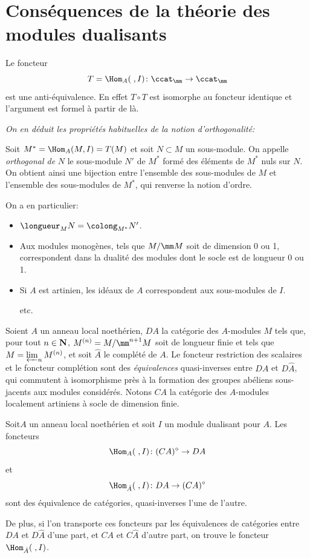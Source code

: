 \section{Cons\'equences de la th\'eorie des modules dualisants} \label{IV.5}

Le foncteur\pageoriginale
$$
T=\Hom_{A}(\;, I)\colon \ccat_{\mm}\to \ccat_{\mm}
$$
est une anti-\'equivalence. En effet $T\circ T$ est isomorphe au foncteur identique et l'argument est formel \`a partir de l\`a.

\emph{On en d\'eduit les propri\'et\'es habituelles de la notion d'orthogonalit\'e:}

Soit $M^{*}=\Hom_{A}(M, I)=T(M)$ et soit $N\subset M$ un sous-module. On appelle \emph{orthogonal de} $N$ le sous-module $N'$ de $M^{*}$ form\'e des \'el\'ements de $M^*$ nuls sur $N$. On obtient ainsi une bijection entre l'ensemble des sous-modules de $M$ et l'ensemble des sous-modules de $M^{*}$, qui renverse la notion d'ordre.

On a en particulier:
\begin{itemize}
\item
$\longueur_{M}N=\colong_{M^{*}}N'$.
\item
Aux modules monog\`enes, \ie tels que $M/\mm M$ soit de dimension 0 ou 1, correspondent dans la dualit\'e des modules dont le socle est de longueur 0 ou 1.
\item
Si $A$ est artinien, les id\'eaux de $A$ correspondent aux sous-modules de $I$.
\par\hfill etc.
\end{itemize}

\smallskip
Soient $A$ un anneau local noeth\'erien, $DA$ la cat\'egorie des $A$-modules $M$ tels que, pour tout $n\in {\bf N}$, $M^{(n)}=M/\mm^{n+1}M$ soit de longueur finie et tels que $M=\varprojlim_{n}M^{(n)}$, et soit $\hat{A}$ le compl\'et\'e de $A$. Le foncteur restriction des scalaires et le foncteur compl\'etion sont des \emph{\'equivalences} quasi-inverses entre $DA$ et $D\hat{A}$, qui commutent \`a isomorphisme pr\`es \`a la formation des groupes ab\'eliens sous-jacents aux modules consid\'er\'es. Notons $CA$ la cat\'egorie des $A$-modules localement artiniens \`a socle de dimension finie.

\begin{proposition} \label{IV.5.1}
Soit\pageoriginale $A$ un anneau local noeth\'erien et soit $I$ un module dualisant pour $A$. Les foncteurs
$$
\Hom_{A}(\;, I)\colon (CA)^{\circ}\to DA
$$
et
$$
\Hom_{\hat{A}}(\;, I)\colon DA\to (CA)^{\circ}
$$
sont des \'equivalence de cat\'egories, quasi-inverses l'une de l'autre.

De plus, si l'on transporte ces foncteurs par les \'equivalences de cat\'egories entre $DA$ et $D\hat{A}$ d'une part, et $CA$ et $C\hat{A}$ d'autre part, on trouve le foncteur $\Hom_{\hat{A}}(\;, I)$.
\end{proposition}

